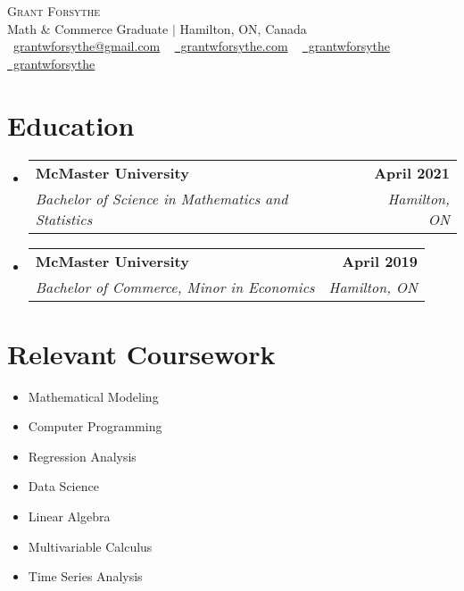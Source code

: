 \documentclass[letterpaper,11pt]{article}
\makeatletter
\newcommand{\resumeSubheading}[4]{
  \vspace{-2pt}\item
    \begin{tabular*}{1.0\textwidth}[t]{l@{\extracolsep{\fill}}r}
      \textbf{#1} & \textbf{\small #2} \\
      \textit{\small#3} & \textit{\small #4} \\
    \end{tabular*}\vspace{-7pt}
}
\newcommand{\resumeSubHeadingListStart}{\begin{itemize}[leftmargin=0.0in, label={}]}
\newcommand{\resumeSubHeadingListEnd}{\end{itemize}}
\makeatother
\begin{document}

\begin{center}
    {\Huge \scshape Grant Forsythe} \\ \vspace{1pt}
    Math \& Commerce Graduate $\vert$ Hamilton, ON, Canada \\ \vspace{1pt}
    \small \raisebox{-0.1\height}\faAt\ \href{mailto:grantwforsythe@gmail.com}{grantwforsythe@gmail.com} ~ \href{https://www.grantwforsythe.com}{\raisebox{-0.2\height}\faGlobe\  grantwforsythe.com} ~ 
    \href{https://linkedin.com/in/grantwforsythe/}{\raisebox{-0.2\height}\faLinkedin\ grantwforsythe}  ~
    \href{https://github.com/grantwforsythe}{\raisebox{-0.2\height}\faGithub\ grantwforsythe}
    \vspace{-8pt}
\end{center}

\section{Education}
  \resumeSubHeadingListStart
    \resumeSubheading
      {McMaster University}{April 2021}
      {Bachelor of Science in Mathematics and Statistics}{Hamilton, ON}
    \resumeSubheading
      {McMaster University}{April 2019}
      {Bachelor of Commerce, Minor in Economics}{Hamilton, ON}
  \resumeSubHeadingListEnd
\vspace{-15pt} 

\section{Relevant Coursework}
        \begin{multicols}{4}
            \begin{itemize}[itemsep=-5pt, parsep=3pt]
                \item\small Mathematical Modeling
                \item Computer Programming
                \item Regression Analysis
                \item Data Science
                \item Linear Algebra
                \item Multivariable Calculus
                \item Time Series Analysis
            \end{itemize}
        \end{multicols}
        \vspace*{2.0\multicolsep}
\vspace{3pt}
\end{document}
